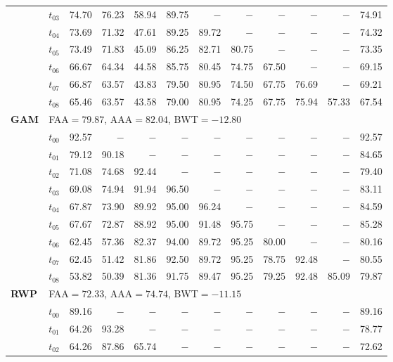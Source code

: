 \begin{table}[ht]
\begin{tabular}{@{}l l r r r r r r r r r r@{}}
 & $t_{03}$ & 74.70 & 76.23 & 58.94 & 89.75 & $-$ & $-$ & $-$ & $-$ & $-$ & 74.91 \\
 & $t_{04}$ & 73.69 & 71.32 & 47.61 & 89.25 & 89.72 & $-$ & $-$ & $-$ & $-$ & 74.32 \\
 & $t_{05}$ & 73.49 & 71.83 & 45.09 & 86.25 & 82.71 & 80.75 & $-$ & $-$ & $-$ & 73.35 \\
 & $t_{06}$ & 66.67 & 64.34 & 44.58 & 85.75 & 80.45 & 74.75 & 67.50 & $-$ & $-$ & 69.15 \\
 & $t_{07}$ & 66.87 & 63.57 & 43.83 & 79.50 & 80.95 & 74.50 & 67.75 & 76.69 & $-$ & 69.21 \\
 & $t_{08}$ & 65.46 & 63.57 & 43.58 & 79.00 & 80.95 & 74.25 & 67.75 & 75.94 & 57.33 & 67.54 \\
\midrule
\multirow{10}{*}{\textbf{GAM}} & \multicolumn{11}{l}{\quad\small FAA$=79.87$,\; AAA$=82.04$,\; BWT$=-12.80$} \\
 & $t_{00}$ & 92.57 & $-$ & $-$ & $-$ & $-$ & $-$ & $-$ & $-$ & $-$ & 92.57 \\
 & $t_{01}$ & 79.12 & 90.18 & $-$ & $-$ & $-$ & $-$ & $-$ & $-$ & $-$ & 84.65 \\
 & $t_{02}$ & 71.08 & 74.68 & 92.44 & $-$ & $-$ & $-$ & $-$ & $-$ & $-$ & 79.40 \\
 & $t_{03}$ & 69.08 & 74.94 & 91.94 & 96.50 & $-$ & $-$ & $-$ & $-$ & $-$ & 83.11 \\
 & $t_{04}$ & 67.87 & 73.90 & 89.92 & 95.00 & 96.24 & $-$ & $-$ & $-$ & $-$ & 84.59 \\
 & $t_{05}$ & 67.67 & 72.87 & 88.92 & 95.00 & 91.48 & 95.75 & $-$ & $-$ & $-$ & 85.28 \\
 & $t_{06}$ & 62.45 & 57.36 & 82.37 & 94.00 & 89.72 & 95.25 & 80.00 & $-$ & $-$ & 80.16 \\
 & $t_{07}$ & 62.45 & 51.42 & 81.86 & 92.50 & 89.72 & 95.25 & 78.75 & 92.48 & $-$ & 80.55 \\
 & $t_{08}$ & 53.82 & 50.39 & 81.36 & 91.75 & 89.47 & 95.25 & 79.25 & 92.48 & 85.09 & 79.87 \\
\midrule
\multirow{10}{*}{\textbf{RWP}} & \multicolumn{11}{l}{\quad\small FAA$=72.33$,\; AAA$=74.74$,\; BWT$=-11.15$} \\
 & $t_{00}$ & 89.16 & $-$ & $-$ & $-$ & $-$ & $-$ & $-$ & $-$ & $-$ & 89.16 \\
 & $t_{01}$ & 64.26 & 93.28 & $-$ & $-$ & $-$ & $-$ & $-$ & $-$ & $-$ & 78.77 \\
 & $t_{02}$ & 64.26 & 87.86 & 65.74 & $-$ & $-$ & $-$ & $-$ & $-$ & $-$ & 72.62 \\

\end{tabular}
\end{table}
